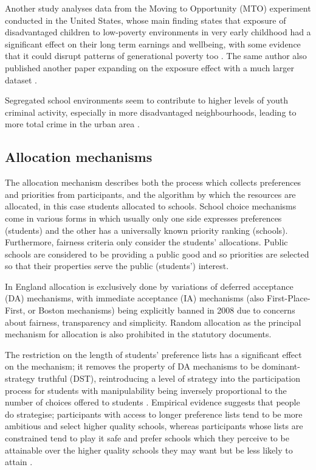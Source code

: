 \documentclass{article}
\begin{document}
\begin{multicols}{2}
Another study analyses data from the Moving to Opportunity (MTO) experiment conducted in the United States, whose main finding states that exposure of disadvantaged children to low-poverty environments in very early childhood had a significant effect on their long term earnings and wellbeing, with some evidence that it could disrupt patterns of generational poverty too \cite{chettyEffectsExposureBetter2016}. The same author also published another paper expanding on the exposure effect with a much larger dataset \cite{chettyImpactsNeighborhoodsIntergenerational2018}.

Segregated school environments seem to contribute to higher levels of youth criminal activity, especially in more disadvantaged neighbourhoods, leading to more total crime in the urban area \cite{billingsPartnersCrime2019}.

\subsection{Allocation mechanisms}
The allocation mechanism describes both the process which collects preferences and priorities from participants, and the algorithm by which the resources are allocated, in this case students allocated to schools. School choice mechanisms come in various forms in which usually only one side expresses preferences (students) and the other has a universally known priority ranking (schools). Furthermore, fairness criteria only consider the students' allocations. Public schools are considered to be providing a public good and so priorities are selected so that their properties serve the public (students') interest. %

In England allocation is exclusively done by variations of deferred acceptance (DA) mechanisms, with immediate acceptance (IA) mechanisms (also First-Place-First, or Boston mechanisms) being explicitly banned in 2008 \cite{pathakSchoolAdmissionsReform2013,terrierImmediateAcceptanceDeferred} due to concerns about fairness, transparency and simplicity. Random allocation as the principal mechanism for allocation is also prohibited in the statutory documents. 

The restriction on the length of students' preference lists has a significant effect on the mechanism; it removes the property of DA mechanisms to be dominant-strategy truthful (DST), reintroducing a level of strategy into the participation process for students \cite{haeringerConstrainedSchoolChoice2009} with manipulability being inversely proportional to the number of choices offered to students \cite{pathakSchoolAdmissionsReform2013}. Empirical evidence suggests that people do strategise; participants with access to longer preference lists tend to be more ambitious and select higher quality schools, whereas participants whose lists are constrained tend to play it safe and prefer schools which they perceive to be attainable over the higher quality schools they may want but be less likely to attain \cite{burgessSchoolChoiceEngland2019}.


\end{multicols}
\end{document}
